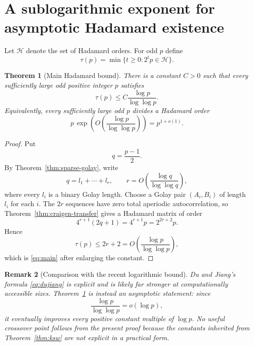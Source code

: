 \documentclass[11pt]{article}
\newtheorem{theorem}{Theorem}[section]
\newtheorem{remark}[theorem]{Remark}
\newcommand{\Hcal}{\mathcal{H}}
\begin{document}
\section{A sublogarithmic exponent for asymptotic Hadamard existence}
Let $\Hcal$ denote the set of Hadamard orders.  For odd $p$ define
\[
\tau(p)=\min\{t\ge0:2^tp\in\Hcal\}.
\]

\begin{theorem}[Main Hadamard bound]\label{thm:main}
There is a constant $C>0$ such that every sufficiently large odd positive integer $p$ satisfies
\begin{equation}\label{eq:main}
\tau(p)\le C\frac{\log p}{\log\log p}.
\end{equation}
Equivalently, every sufficiently large odd $p$ divides a Hadamard order
\[
p\,\exp\!\left(O\!\left(\frac{\log p}{\log\log p}\right)\right)=p^{1+o(1)}.
\]
\end{theorem}

\begin{proof}
Put
\[
q=\frac{p-1}{2}.
\]
By Theorem~\ref{thm:sparse-golay}, write
\[
q=l_1+\cdots+l_r,
\qquad
r=O\!\left(\frac{\log q}{\log\log q}\right),
\]
where every $l_i$ is a binary Golay length.  Choose a Golay pair $(A_i,B_i)$ of length $l_i$ for each $i$.  The $2r$ sequences have zero total aperiodic autocorrelation, so Theorem~\ref{thm:craigen-transfer} gives a Hadamard matrix of order
\[
4^{r+1}(2q+1)=4^{r+1}p=2^{2r+2}p.
\]
Hence
\[
\tau(p)\le 2r+2
=O\!\left(\frac{\log p}{\log\log p}\right),
\]
which is \eqref{eq:main} after enlarging the constant.
\end{proof}

\begin{remark}[Comparison with the recent logarithmic bound]
Du and Jiang's formula \eqref{eq:dujiang} is explicit and is likely far stronger at computationally accessible sizes.  Theorem~\ref{thm:main} is instead an asymptotic statement: since
\[
\frac{\log p}{\log\log p}=o(\log p),
\]
it eventually improves every positive constant multiple of $\log p$.  No useful crossover point follows from the present proof because the constants inherited from Theorem~\ref{thm:ksw} are not explicit in a practical form.
\end{remark}
\end{document}

